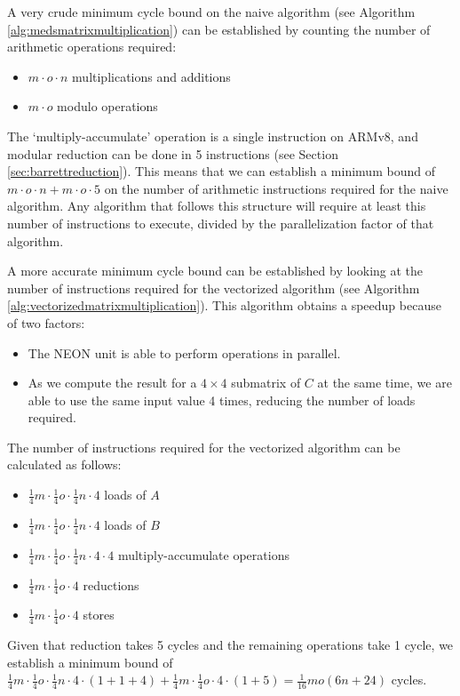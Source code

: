 \documentclass[11pt,a4paper]{report}
\theoremstyle{definition}
\begin{document}
A very crude minimum cycle bound on the naive algorithm (see Algorithm \ref{alg:medsmatrixmultiplication}) can be established by counting the number of arithmetic operations required:
\begin{itemize}
  \item $m \cdot o \cdot n$ multiplications and additions
  \item $m \cdot o$ modulo operations
\end{itemize}
The `multiply-accumulate' operation is a single instruction on ARMv8, and modular reduction can be done in 5 instructions (see Section \ref{sec:barrettreduction}). This means that we can establish a minimum bound of $m \cdot o \cdot n + m \cdot o \cdot 5$ on the number of arithmetic instructions required for the naive algorithm. Any algorithm that follows this structure will require at least this number of instructions to execute, divided by the parallelization factor of that algorithm.

A more accurate minimum cycle bound can be established by looking at the number of instructions required for the vectorized algorithm (see Algorithm \ref{alg:vectorizedmatrixmultiplication}). This algorithm obtains a speedup because of two factors:
\begin{itemize}
  \item The NEON unit is able to perform operations in parallel.
  \item As we compute the result for a $4\times4$ submatrix of $C$ at the same time, we are able to use the same input value 4 times, reducing the number of loads required.
\end{itemize}
The number of instructions required for the vectorized algorithm can be calculated as follows:
\begin{itemize}
  \item $\frac{1}{4}m \cdot \frac{1}{4}o \cdot \frac{1}{4}n \cdot 4$ loads of $A$
  \item $\frac{1}{4}m \cdot \frac{1}{4}o \cdot \frac{1}{4}n \cdot 4$ loads of $B$
  \item $\frac{1}{4}m \cdot \frac{1}{4}o \cdot \frac{1}{4}n \cdot 4 \cdot 4$ multiply-accumulate operations
  \item $\frac{1}{4}m \cdot \frac{1}{4}o \cdot 4$ reductions
  \item $\frac{1}{4}m \cdot \frac{1}{4}o \cdot 4$ stores
\end{itemize}
Given that reduction takes 5 cycles and the remaining operations take 1 cycle, we establish a minimum bound of $\frac{1}{4}m \cdot \frac{1}{4}o \cdot \frac{1}{4}n \cdot 4 \cdot (1 + 1 + 4) + \frac{1}{4}m \cdot \frac{1}{4}o \cdot 4 \cdot (1 + 5) = \frac{1}{16}mo(6n + 24)$ cycles.
\end{document}
